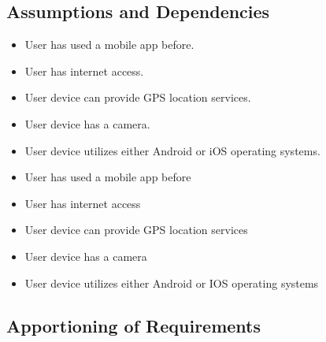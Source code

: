 \documentclass{article}
\begin{document}
\subsection{Assumptions and Dependencies}

\begin{itemize}
    \item User has used a mobile app before.
    \item User has internet access.
    \item User device can provide GPS location services.
    \item User device has a camera.
    \item User device utilizes either Android or iOS operating systems.
\end{itemize}

\begin{itemize}
    \item User has used a mobile app before
    \item User has internet access
    \item User device can provide GPS location services
    \item User device has a camera
    \item User device utilizes either Android or IOS operating systems
\end{itemize}

\subsection{Apportioning of Requirements}

\end{document}

